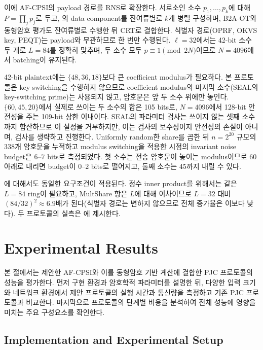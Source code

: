 \documentclass[sigconf,anonymous,review]{acmart}
\begin{document}
이에 AF-CPSI의 payload 경로를 RNS로 확장한다. 서로소인 소수
$p_1,\dots,p_k$에 대해 $P=\prod_j p_j$로 두고, 의 data
component를 잔여류별로 $k$개 병렬 구성하며, B2A-OT와 동형암호 평가도
잔여류별로 수행한 뒤 CRT로 결합한다. 식별자 경로(OPRF, OKVS key, PEQT)는
payload와 무관하므로 한 번만 수행된다. $\ell=32$에서는 42-bit 소수 두 개로
$L=84$를 정확히 맞추며, 두 소수 모두 $p\equiv1\pmod{2N}$이므로 $N=4096$에서
batching이 유지된다.

42-bit plaintext에는 $\{48,36,18\}$보다 큰 coefficient modulus가 필요하다. 본
프로토콜은 key switching을 수행하지 않으므로 coefficient modulus의 마지막
소수(SEAL의 key-switching prime)는 사용되지 않고, 암호문은 앞 두 소수 위에만
놓인다. $\{60,45,20\}$에서 실제로 쓰이는 두 소수의 합은 105 bits로, $N=4096$에서
128-bit 안전성을 주는 109-bit 상한 이내이다. SEAL의 파라미터 검사는 쓰이지
않는 셋째 소수까지 합산하므로 이 설정을 거부하지만, 이는 검사의 보수성이지
안전성의 손실이 아니며, 검사를 생략하고 진행한다.
Uniformly random한 share를
곱한 뒤 $n=2^{20}$ 규모의 338개 암호문을 누적하고 modulus switching을
적용한 시점의 invariant noise budget은 $6$--$7$ bits로 측정되었다. 첫 소수는
전송 암호문이 놓이는 modulus이므로 60 아래로 내리면 budget이 $0$--$2$ bits로
떨어지고, 둘째 소수는 45까지 내릴 수 있다.

\cite{KLS26}에 대해서도 동일한 요구조건이 적용된다. 정수 inner product를
위해서는 같은 $L=84$ ring이 필요하고, MultShare 항은 $L$에 대해 이차이므로
$L=32$ 대비 $(84/32)^2\approx6.9$배가 된다(식별자 경로는 변하지 않으므로 전체
증가율은 이보다 낮다). 두 프로토콜의 실측은 에 제시한다.

\section{Experimental Results}
\label{sec:experimental-results}
본 절에서는 제안한 AF-CPSI와 이를 동형암호 기반 계산에 결합한
PJC 프로토콜의 성능을 평가한다.
먼저 구현 환경과 암호학적 파라미터를 설명한 뒤,
다양한 입력 크기와 네트워크 환경에서 제안 프로토콜의
실행 시간과 통신량을 측정하고 기존 PJC 프로토콜과 비교한다.
마지막으로 프로토콜의 단계별 비용을 분석하여
전체 성능에 영향을 미치는 주요 구성요소를 확인한다.



\subsection{Implementation and Experimental Setup}
\label{sec:experimental-setup}
\end{document}
